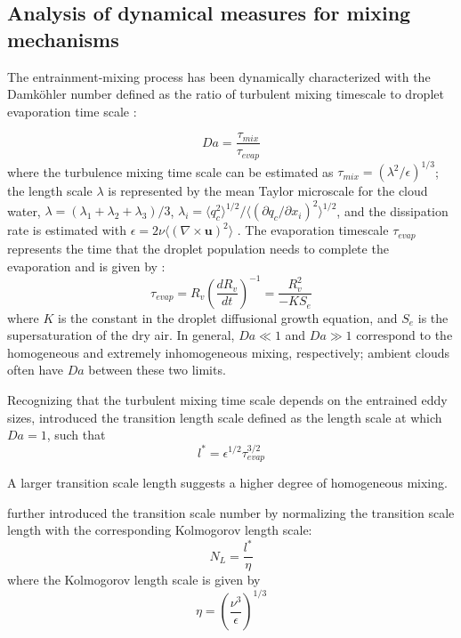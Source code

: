 \documentclass[draft,linenumbers]{AGUJournal}
\begin{document}
\subsection{Analysis of dynamical measures for mixing mechanisms}
The entrainment-mixing process has been dynamically characterized with the Damk{\"o}hler number defined as the ratio of 
turbulent mixing timescale to droplet evaporation time scale
\citep{Baker1980, Krueger1997Modeling, Grabowski1993Cumulus}:

\begin{equation}
Da=\frac{\tau_{mix}}{\tau_{evap}}\label{eq:DaNumber}
\end{equation}
where the turbulence mixing time scale can be estimated as $\tau_{mix} = (\lambda^2/\epsilon)^{1/3}$; the length scale $\lambda$ is represented by the mean Taylor microscale for the cloud water, $\lambda = 
(\lambda_1+\lambda_2+\lambda_3)/3$, $\lambda_i = \langle q_c^2\rangle^{1/2}/\langle(\partial q_c/\partial x_i)^2\rangle^{1/2}$, and the dissipation rate is estimated with $\epsilon = 2\nu\langle(\nabla\times \mathbf{u})^2\rangle$ \citep{And09}. The evaporation timescale $\tau_{evap}$ represents the time that the 
droplet population needs to complete the evaporation and is given by 
\citet{And09, Burnet2007Observational}:
\begin{equation}
\tau_{evap} = R_v(\frac{dR_v}{dt})^{-1} = \frac{R_v^2}{-KS_e}
\end{equation}
where $K$ is the constant in the droplet diffusional growth equation, and $S_e$ is the supersaturation of the dry air. In general, $Da \ll 1$ and $Da \gg 1$ correspond to the homogeneous and extremely inhomogeneous mixing, respectively; ambient clouds often have $Da$ between these two limits.

Recognizing that the turbulent mixing time scale depends on the entrained eddy sizes, \citet{Lehmann2009} introduced the transition length scale defined as the length scale at which $Da = 1$, such that
\begin{equation}
l^{*}=\epsilon^{1/2}\tau_{evap}^{3/2}
\end{equation}

A larger transition scale length suggests a higher degree of homogeneous mixing.
 
\citet{Lu2011} further introduced the transition scale number by normalizing the transition scale length with the corresponding Kolmogorov length scale:
\begin{equation}
N_{L}=\frac{l^{*}}{\eta}\label{eq:NL}
\end{equation}
where the Kolmogorov length scale is given by
\begin{equation}
\eta = (\frac{\nu^3}{\epsilon})^{1/3}
\end{equation}
\end{document}
